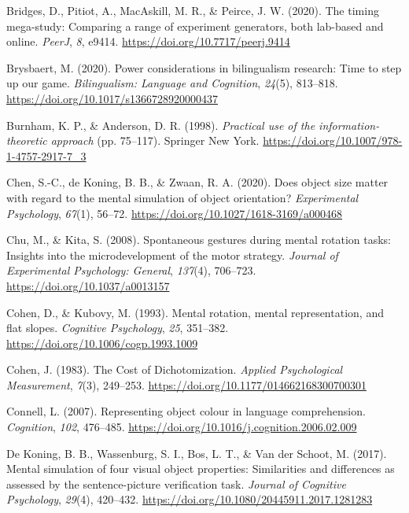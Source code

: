 \documentclass[
  man,floatsintext]{apa7}
\newlength{\cslhangindent}
\newlength{\cslentryspacingunit} %
\newenvironment{CSLReferences}[2] %
 {%
  \setlength{\parindent}{0pt}
  \ifodd #1
  \let\oldpar\par
  \def\par{\hangindent=\cslhangindent\oldpar}
  \fi
  \setlength{\parskip}{#2\cslentryspacingunit}
 }%
 {}
\begin{document}
\begin{CSLReferences}{1}{0}
\leavevmode{}%
Bridges, D., Pitiot, A., MacAskill, M. R., \& Peirce, J. W. (2020). The timing mega-study: Comparing a range of experiment generators, both lab-based and online. \emph{PeerJ}, \emph{8}, e9414. \url{https://doi.org/10.7717/peerj.9414}

\leavevmode{}%
Brysbaert, M. (2020). Power considerations in bilingualism research: Time to step up our game. \emph{Bilingualism: Language and Cognition}, \emph{24}(5), 813--818. \url{https://doi.org/10.1017/s1366728920000437}

\leavevmode{}%
Burnham, K. P., \& Anderson, D. R. (1998). \emph{Practical use of the information-theoretic approach} (pp. 75--117). Springer New York. \url{https://doi.org/10.1007/978-1-4757-2917-7_3}

\leavevmode{}%
Chen, S.-C., de Koning, B. B., \& Zwaan, R. A. (2020). Does object size matter with regard to the mental simulation of object orientation? \emph{Experimental Psychology}, \emph{67}(1), 56--72. \url{https://doi.org/10.1027/1618-3169/a000468}

\leavevmode{}%
Chu, M., \& Kita, S. (2008). Spontaneous gestures during mental rotation tasks: {Insights} into the microdevelopment of the motor strategy. \emph{Journal of Experimental Psychology: General}, \emph{137}(4), 706--723. \url{https://doi.org/10.1037/a0013157}

\leavevmode{}%
Cohen, D., \& Kubovy, M. (1993). Mental rotation, mental representation, and flat slopes. \emph{Cognitive Psychology}, \emph{25}, 351--382. \url{https://doi.org/10.1006/cogp.1993.1009}

\leavevmode{}%
Cohen, J. (1983). The Cost of Dichotomization. \emph{Applied Psychological Measurement}, \emph{7}(3), 249--253. \url{https://doi.org/10.1177/014662168300700301}

\leavevmode{}%
Connell, L. (2007). Representing object colour in language comprehension. \emph{Cognition}, \emph{102}, 476--485. \url{https://doi.org/10.1016/j.cognition.2006.02.009}

\leavevmode{}%
De Koning, B. B., Wassenburg, S. I., Bos, L. T., \& Van der Schoot, M. (2017). Mental simulation of four visual object properties: Similarities and differences as assessed by the sentence-picture verification task. \emph{Journal of Cognitive Psychology}, \emph{29}(4), 420--432. \url{https://doi.org/10.1080/20445911.2017.1281283}


\end{CSLReferences}
\end{document}
